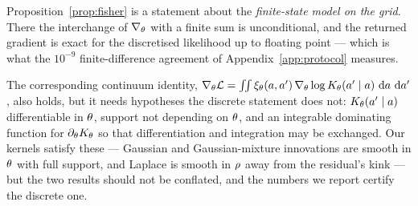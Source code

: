 
\begin{remark}
\label{rem:fisher-scope}
Proposition~\ref{prop:fisher} is a statement about the \emph{finite-state model on the grid}. There
the interchange of $\nabla_\theta$ with a finite sum is unconditional, and the returned gradient
is exact for the discretised likelihood up to floating point --- which is what the
$10^{-9}$ finite-difference agreement of Appendix~\ref{app:protocol} measures.

The corresponding continuum identity,
$\nabla_\theta \mathcal{L} = \int\!\!\int \xi_\theta(a,a')\,\nabla_\theta \log
K_\theta(a'\mid a)\,\,\mathrm{d} a\,\,\mathrm{d} a'$, also holds, but it needs hypotheses the discrete
statement does not: $K_\theta(a'\mid a)$ differentiable in $\theta$, support not depending
on $\theta$, and an integrable dominating function for $\partial_\theta K_\theta$ so that
differentiation and integration may be exchanged. Our kernels satisfy these --- Gaussian and
Gaussian-mixture innovations are smooth in $\theta$ with full support, and Laplace is smooth in
$\rho$ away from the residual's kink --- but the two results should not be conflated, and the
numbers we report certify the discrete one.
\end{remark}
